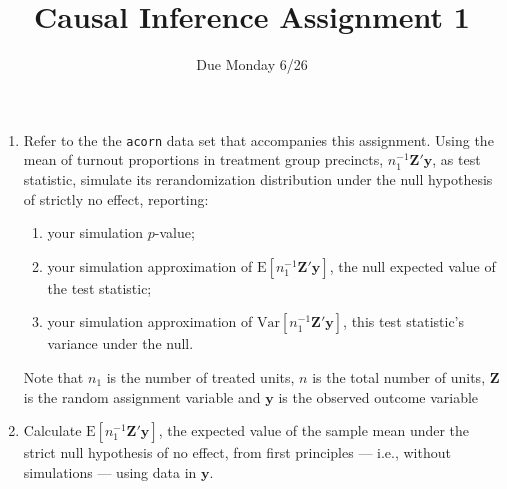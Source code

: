 \documentclass{article}
\title{Causal Inference Assignment 1}
\author{Due Monday 6/26}
\begin{document}
\maketitle

\begin{enumerate}
\item Refer to the the \texttt{acorn} data set that accompanies this assignment.  Using the mean of turnout proportions in
treatment group precincts, $n_{1}^{-1}\mathbf{Z}'\mathbf{y}$, as
test statistic, simulate its rerandomization distribution under the
null hypothesis of strictly no effect, reporting: \label{q:simmoments}
\begin{enumerate}
  \item your simulation $p$-value; 
  \item your simulation approximation of $\mathrm{E}[
    n_{1}^{-1}\mathbf{Z}'\mathbf{y}]$, the null expected value of the test
    statistic; 
  \item your simulation approximation of
    $\mathrm{Var}[n_{1}^{-1}\mathbf{Z}'\mathbf{y}]$, this test
    statistic's variance under the null.
  \end{enumerate}
 Note that $n_1$ is the number of treated units, $n$ is the total number of units, $\mathbf{Z}$ is the random assignment variable and $\mathbf{y}$ is the observed outcome variable
\item Calculate $\mathrm{E} [ n_{1}^{-1}\mathbf{Z}'\mathbf{y} ]$, the expected value of the
  sample mean under the strict null hypothesis of no effect, from first principles --- i.e., without simulations ---  using data in $\mathbf{y}$.  \label{q:exactEV}

\end{enumerate}
\end{document}
